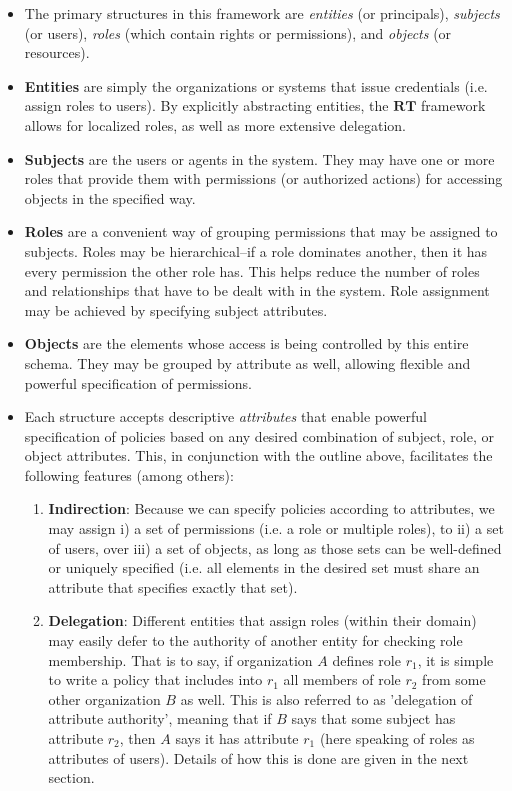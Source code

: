 \documentclass{article}
\providecommand{\RT}{\textbf{RT}}
\begin{document}
\begin{itemize}
  \item The primary structures in this framework are \textit{entities} (or principals), \textit{subjects} (or users), \textit{roles} (which contain rights or permissions), and \textit{objects} (or resources).
  \item \textbf{Entities} are simply the organizations or systems that issue credentials (i.e. assign roles to users). By explicitly abstracting entities, the $\RT$ framework allows for localized roles, as well as more extensive delegation.
  \item \textbf{Subjects} are the users or agents in the system. They may have one or more roles that provide them with permissions (or authorized actions) for accessing objects in the specified way.
  \item \textbf{Roles} are a convenient way of grouping permissions that may be assigned to subjects. Roles may be hierarchical--if a role dominates another, then it has every permission the other role has. This helps reduce the number of roles and relationships that have to be dealt with in the system. Role assignment may be achieved by specifying subject attributes.
  \item \textbf{Objects} are the elements whose access is being controlled by this entire schema. They may be grouped by attribute as well, allowing flexible and powerful specification of permissions.
  \item Each structure accepts descriptive \textit{attributes} that enable powerful specification of policies based on any desired combination of subject, role, or object attributes. This, in conjunction with the outline above, facilitates the following features (among others): \\
  \begin{enumerate}
    \item \textbf{Indirection}: Because we can specify policies according to attributes, we may assign i) a set of permissions (i.e. a role or multiple roles), to ii) a set of users, over iii) a set of objects, as long as those sets can be well-defined or uniquely specified (i.e. all elements in the desired set must share an attribute that specifies exactly that set).
    \item \textbf{Delegation}: Different entities that assign roles (within their domain) may easily defer to the authority of another entity for checking role membership. That is to say, if organization $A$ defines role $r_1$, it is simple to write a policy that includes into $r_1$ all members of role $r_2$ from some other organization $B$ as well. This is also referred to as 'delegation of attribute authority', meaning that if $B$ says that some subject has attribute $r_2$, then $A$ says it has attribute $r_1$ (here speaking of roles as attributes of users). Details of how this is done are given in the next section.

\end{enumerate}
\end{itemize}
\end{document}
